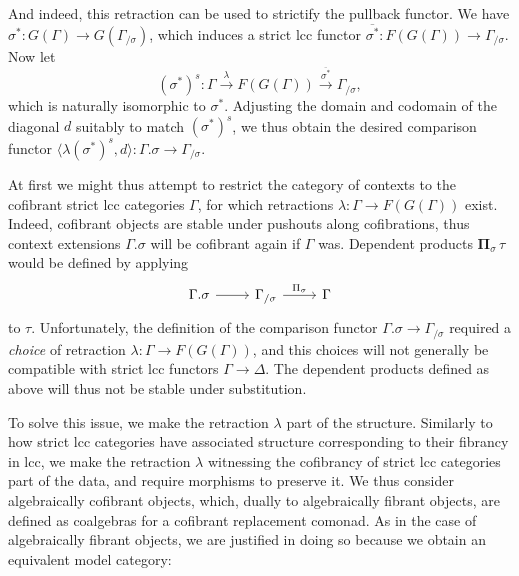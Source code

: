 \documentclass[a4paper]{article}
\theoremstyle{remark}
\theoremstyle{definition}
\begin{document}
And indeed, this retraction can be used to strictify the pullback functor.
We have $\sigma^* : G(\Gamma) \rightarrow G(\Gamma_{/ \sigma})$, which induces a strict lcc functor $\overline{\sigma^*} : F(G(\Gamma)) \rightarrow \Gamma_{/ \sigma}$.
Now let
\begin{equation}
  (\sigma^*)^s : \Gamma \xrightarrow{\lambda} F(G(\Gamma)) \xrightarrow{\overline{\sigma^*}} \Gamma_{/ \sigma},
\end{equation}
which is naturally isomorphic to $\sigma^*$.
Adjusting the domain and codomain of the diagonal $d$ suitably to match $(\sigma^*)^s$, we thus obtain the desired comparison functor $\langle \lambda (\sigma^*)^s, d \rangle : \Gamma.\sigma \rightarrow \Gamma_{/ \sigma}$.

At first we might thus attempt to restrict the category of contexts to the cofibrant strict lcc categories $\Gamma$, for which retractions $\lambda : \Gamma \rightarrow F(G(\Gamma))$ exist.
Indeed, cofibrant objects are stable under pushouts along cofibrations, thus context extensions $\Gamma.\sigma$ will be cofibrant again if $\Gamma$ was.
Dependent products $\mathbf{\Pi}_\sigma \, \tau$ would be defined by applying
\begin{equation}
  \begin{tikzcd}
    \Gamma.\sigma \arrow[r] & \Gamma_{/ \sigma} \arrow[r, "\Pi_\sigma"] & \Gamma
  \end{tikzcd}
\end{equation}
to $\tau$.
Unfortunately, the definition of the comparison functor $\Gamma.\sigma \rightarrow \Gamma_{/ \sigma}$ required a \emph{choice} of retraction $\lambda : \Gamma \rightarrow F(G(\Gamma))$, and this choices will not generally be compatible with strict lcc functors $\Gamma \rightarrow \Delta$.
The dependent products defined as above will thus not be stable under substitution.

To solve this issue, we make the retraction $\lambda$ part of the structure.
Similarly to how strict lcc categories have associated structure corresponding to their fibrancy in lcc, we make the retraction $\lambda$ witnessing the cofibrancy of strict lcc categories part of the data, and require morphisms to preserve it.
We thus consider algebraically cofibrant objects, which, dually to algebraically fibrant objects, are defined as coalgebras for a cofibrant replacement comonad.
As in the case of algebraically fibrant objects, we are justified in doing so because we obtain an equivalent model category:
\end{document}
